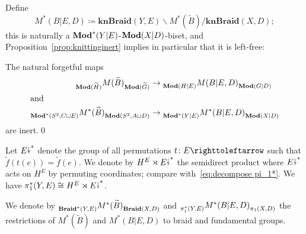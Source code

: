 \documentclass{amsart}
\newcommand\Braid{{\mathbf{Braid}}}
\newcommand\knBraid{{\mathbf{knBraid}}}
\newcommand\wtf{{\widetilde f}}
\newcommand\wtB{{\widetilde B}}
\newcommand\wtG{{\widetilde G}}
\newcommand\wtH{{\widetilde H}}
\begin{document}
\noindent Define
\begin{equation}\label{eq:defn:M*|ED}
M^*(B|E,D)\coloneqq \knBraid(Y,E)\backslash M^*(\wtB)/\knBraid(X,D);
\end{equation}
this is naturally a $\mathbf{\relax Mod}^*(Y|E)$-$\mathbf{\relax Mod}(X|D)$-biset, and
Proposition~\ref{prop:knittinginert} implies in particular that it is
left-free:
\begin{prop}\label{prop:inertMCB}
  The natural forgetful maps
  \begin{align*}
    \subscript{\Mod(\wtH)}{M(\wtB)}_{\Mod(\wtG)}
    &\to\subscript{\Mod(H|E)}{M(B|E,D)}_{\Mod(G|D)}\\
    \intertext{and}
    \subscript{\Mod^*(S^2,C\sqcup E)}{M^*(\wtB)}_{\Mod(S^2,A\sqcup D)}
    &\to\subscript{\Mod^*(Y|E)}{M^*(B|E,D)}_{\Mod(X|D)}
  \end{align*}
  are inert.\qed
\end{prop}

Let $E{\stackrel{\downarrow}{\smash.}}^*$ denote the group of all permutations
$t\colon E\selfmap$ such that $\wtf(t(e))=\wtf(e)$. We denote by
$H^E\rtimes E{\stackrel{\downarrow}{\smash.}}^*$ the semidirect product where $E{\stackrel{\downarrow}{\smash.}}^*$ acts on
$H^E$ by permuting coordinates; compare with~\eqref{eq:decompose
  pi_1*}. We have $\pi_1^*(Y,E)\cong H^E\rtimes E{\stackrel{\downarrow}{\smash.}}^*$.

We denote by
$\subscript{\Braid^*(Y,E)}{M^*(\wtB)}_{\Braid(X,D)}$ and
$\subscript{\pi^*_1(Y,E)}{M^*(B|E,D)}_{\pi_1(X,D)}$ the restrictions
of $M^*(\wtB)$ and $M^*(B|E,D)$ to braid and fundamental
groups.
\end{document}
